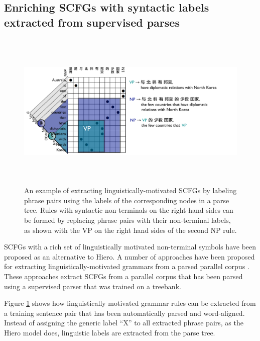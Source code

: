 \subsection{Enriching SCFGs with syntactic labels extracted from supervised parses}\label{samt}


\begin{figure}
\begin{center}
\includegraphics[height=3in]{SCFGs/scfg-phrase-extraction.pdf}
\end{center}
\caption{An example of extracting linguistically-motivated SCFGs by labeling phrase pairs using the labels of the corresponding nodes in a parse tree.  Rules with syntactic non-terminals on the right-hand sides can be formed by replacing  phrase pairs with their non-terminal labels, as shown with the VP on the right hand sides of the second NP rule.}\label{scfg-phrase-extraction}
\end{figure}


SCFGs with a rich set of linguistically motivated non-terminal symbols have been proposed as an alternative to Hiero. A number of approaches have been proposed for extracting linguistically-motivated grammars from a parsed parallel corpus \cite{Galley2004,samt}.   These approaches extract SCFGs from a parallel corpus that has been parsed using a supervised parser that was trained on a treebank.  

Figure \ref{scfg-phrase-extraction} shows how linguistically motivated grammar rules can be extracted from a training sentence pair that has been automatically parsed and word-aligned.    Instead of assigning the generic label ``X'' to all extracted phrase pairs, as the Hiero model does, linguistic labels are extracted from the parse tree.   

